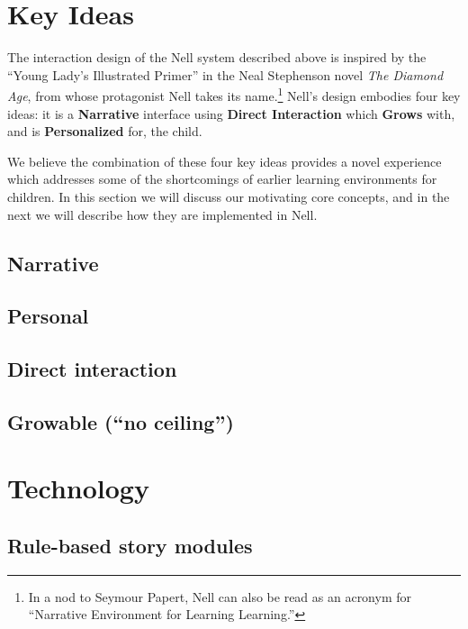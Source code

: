 \documentclass{acm_proc_article-sp}
\begin{document}
\section{Key Ideas}
The interaction design of the Nell system described above is inspired
by the ``Young Lady's Illustrated Primer'' in the Neal Stephenson
novel \textit{The Diamond Age}, from whose protagonist Nell takes its
name.\footnote{In a nod to Seymour Papert, Nell can also be read as an
acronym for ``Narrative Environment for Learning Learning.''}
Nell's design embodies four key ideas: it is a \textbf{Narrative}
interface using \textbf{Direct Interaction} which \textbf{Grows} with,
and is \textbf{Personalized} for, the child.

We believe the combination of these four key ideas provides a novel
experience which addresses some of the shortcomings of earlier
learning environments for children.  In this section we will discuss
our motivating core concepts, and in the next we will describe how
they are implemented in Nell.


\subsection{Narrative}
\subsection{Personal}
\subsection{Direct interaction}
\subsection{Growable (``no ceiling'')}


\section{Technology}
\subsection{Rule-based story modules}
\end{document}
